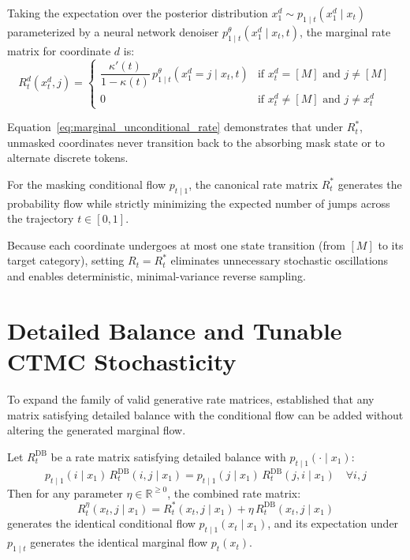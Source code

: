 Taking the expectation over the posterior distribution $x_1^d \sim p_{1 \mid t}(x_1^d \mid x_t)$ parameterized by a neural network denoiser $p_{1 \mid t}^\theta(x_1^d \mid x_t, t)$, the marginal rate matrix for coordinate $d$ is:
\begin{equation}
R_t^d(x_t^d, j) = 
\begin{cases}
\dfrac{\kappa'(t)}{1 - \kappa(t)} \, p_{1 \mid t}^\theta(x_1^d = j \mid x_t, t) & \text{if } x_t^d = [M] \text{ and } j \ne [M] \\[10pt]
0 & \text{if } x_t^d \ne [M] \text{ and } j \ne x_t^d
\end{cases}
\label{eq:marginal_unconditional_rate}
\end{equation}

Equation~\ref{eq:marginal_unconditional_rate} demonstrates that under $R_t^*$, unmasked coordinates never transition back to the absorbing mask state or to alternate discrete tokens.

\begin{pro}
For the masking conditional flow $p_{t \mid 1}$, the canonical rate matrix $R_t^*$ generates the probability flow while strictly minimizing the expected number of jumps across the trajectory $t \in [0, 1]$.
\end{pro}

Because each coordinate undergoes at most one state transition (from $[M]$ to its target category), setting $R_t = R_t^*$ eliminates unnecessary stochastic oscillations and enables deterministic, minimal-variance reverse sampling.

\section{Detailed Balance and Tunable CTMC Stochasticity}

To expand the family of valid generative rate matrices, \citet{Campbell2024} established that any matrix satisfying detailed balance with the conditional flow can be added without altering the generated marginal flow.

\begin{pro}
Let $R_t^{\text{DB}}$ be a rate matrix satisfying detailed balance with $p_{t \mid 1}(\cdot \mid x_1)$:
\begin{equation}
p_{t \mid 1}(i \mid x_1) \, R_t^{\text{DB}}(i, j \mid x_1) = p_{t \mid 1}(j \mid x_1) \, R_t^{\text{DB}}(j, i \mid x_1) \quad \forall i, j
\label{eq:detailed_balance_condition}
\end{equation}
Then for any parameter $\eta \in \mathbb{R}^{\ge 0}$, the combined rate matrix:
\begin{equation}
R_t^\eta(x_t, j \mid x_1) = R_t^*(x_t, j \mid x_1) + \eta \, R_t^{\text{DB}}(x_t, j \mid x_1)
\label{eq:rate_eta_family}
\end{equation}
generates the identical conditional flow $p_{t \mid 1}(x_t \mid x_1)$, and its expectation under $p_{1 \mid t}$ generates the identical marginal flow $p_t(x_t)$.
\end{pro}

